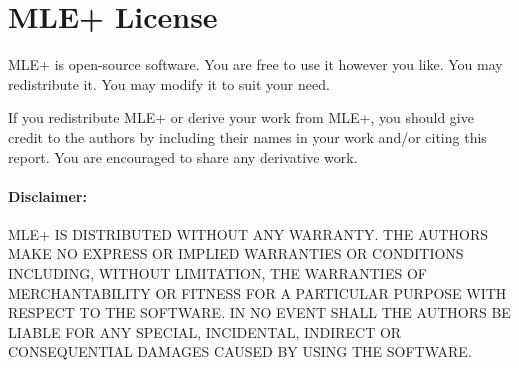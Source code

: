 \documentclass[11pt,letter]{article}
\newcommand{\MLEP}{MLE+\xspace}
\begin{document}



\clearpage
\appendix

\section{\MLEP License}
\label{sec:license}

\MLEP is open-source software.
You are free to use it however you like.
You may redistribute it.
You may modify it to suit your need.

If you redistribute \MLEP or derive your work from \MLEP, you should
give credit to the authors by including their names in your work and/or citing this report.
You are encouraged to share any derivative work.

\paragraph{Disclaimer:}
\MLEP IS DISTRIBUTED WITHOUT ANY WARRANTY.  THE AUTHORS
MAKE NO EXPRESS OR IMPLIED WARRANTIES OR CONDITIONS INCLUDING, WITHOUT
LIMITATION, THE WARRANTIES OF MERCHANTABILITY OR FITNESS FOR A
PARTICULAR PURPOSE WITH RESPECT TO THE SOFTWARE.  IN NO EVENT SHALL
THE AUTHORS BE LIABLE FOR ANY SPECIAL, INCIDENTAL, INDIRECT OR
CONSEQUENTIAL DAMAGES CAUSED BY USING THE SOFTWARE.
\end{document}
